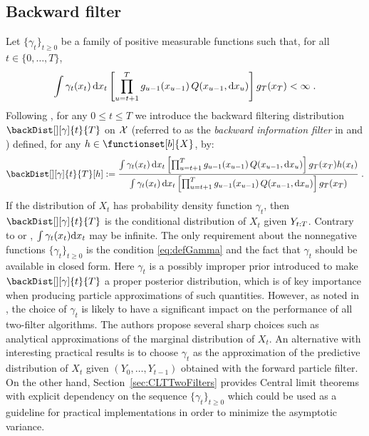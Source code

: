 \subsection{Backward filter}
Let $\{\gamma_t\}_{t \geq 0}$ be a family of positive measurable functions such that, for all $t\in \{0, \ldots, T\}$,
\begin{equation}\label{eq:defGamma}
\int \gamma_t(x_t) \, \mathrm{d} x_t \left[\prod_{u = t+1}^T g_{u-1}(x_{u-1}) \, Q(x_{u-1}, \mathrm{d} x_u) \right] g_T(x_T) < \infty \;.
\end{equation}
Following \cite{briers:doucet:maskell:2010}, for any $0\le t\le T$ we introduce the backward filtering distribution $\backDist[][\gamma]{t}{T}$ on $\mathcal{X}$ (referred to as the  \emph{backward information filter} in \cite{kitagawa:1996} and \cite{briers:doucet:maskell:2010}) defined, for any $h\in \functionset[b]{X}$, by:
\[
\backDist[][\gamma]{t}{T}[h] \eqdef \\
\frac{\int \gamma_t(x_t) \, \rmd x_t\left[\prod_{u=t+1}^T g_{u-1}(x_{u-1}) \, Q(x_{u-1},\rmd x_u)\right] g_T(x_T) h(x_t)}{\int \gamma_t(x_t) \, \rmd x_t \left[ \prod_{u=t+1}^T g_{u-1}(x_{u-1}) \, Q(x_{u-1},\rmd x_u )\right] g_T(x_T)} \eqsp.
\]
If the distribution of $X_t$ has probability density function $\gamma_t$, then $\backDist[][\gamma]{t}{T}$ is the conditional distribution of $X_t$ given $\chunk{Y}{t}{T}$.  Contrary to \cite{briers:doucet:maskell:2010} or \cite{fearnhead:wyncoll:tawn:2010}, $\int \gamma_t(x_t)\mathrm{d} x_t$ may be infinite. The only requirement about the nonnegative functions $\{\gamma_t\}_{t\geq 0}$ is the condition \eqref{eq:defGamma} and the fact that $\gamma_t$ should be available in closed form. Here $\gamma_t$ is a possibly improper prior introduced to make $\backDist[][\gamma]{t}{T}$ a proper posterior distribution, which is of key importance when producing particle approximations of such quantities. However, as noted in \cite[Section~2.3]{briers:doucet:maskell:2010}, the choice of $\gamma_t$ is likely to have a significant impact on the performance of all two-filter algorithms. The authors propose several sharp choices such as analytical approximations of the marginal distribution of $X_t$. An alternative with interesting practical results is to choose $\gamma_t$ as the approximation of the predictive distribution of $X_t$ given $(Y_{0},\ldots,Y_{t-1})$ obtained with the forward particle filter. On the other hand, Section~\ref{sec:CLTTwoFilters} provides Central limit theorems with explicit dependency on the sequence $\{\gamma_t\}_{t\ge 0}$ which could be used as a guideline for practical implementations in order to minimize the asymptotic variance.



